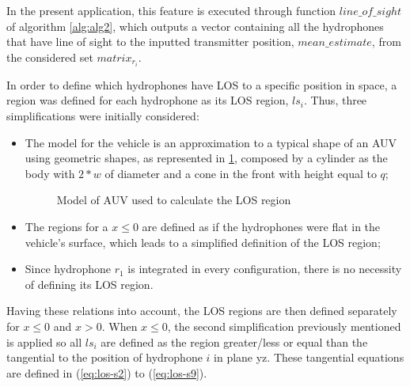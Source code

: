 In the present application, this feature is executed through function $line\_of\_sight$ of algorithm \ref{alg:alg2}, which outputs a vector containing all the hydrophones that have line of sight to the inputted transmitter position, $mean\_estimate$, from the considered set $matrix_{r_{i}}$. 

In order to define which hydrophones have LOS to a specific position in space, a region was defined for each hydrophone as its LOS region, $ls_i$. Thus, three simplifications were initially considered: 
\begin{itemize}
	\item The model for the vehicle is an approximation to a typical shape of an AUV using geometric shapes, as represented in \ref{fig:auv-geo}, composed by a cylinder as the body with $2*w$ of diameter and a cone in the front with height equal to $q$;
	
	\begin{figure}[!htbp]
		\captionsetup{justification=centering,margin=2cm}
		\caption{Model of AUV used to calculate the LOS region}
		\label{fig:auv-geo}
	\end{figure}
	
	\item The regions for a $x \leq 0$ are defined as if the hydrophones were flat in the vehicle's surface, which leads to a simplified definition of the LOS region;
	
	\item Since hydrophone $r_1$ is integrated in every configuration, there is no necessity of defining its LOS region.
	
\end{itemize}

Having these relations into account, the LOS regions are then defined separately for $x \leq 0$ and $x > 0$. When $x \leq 0$, the second simplification previously mentioned is applied so all $ls_i$ are defined as the region greater/less or equal than the tangential to the position of hydrophone $i$ in plane yz. These tangential equations are defined in (\ref{eq:los-s2}) to (\ref{eq:los-s9}).

